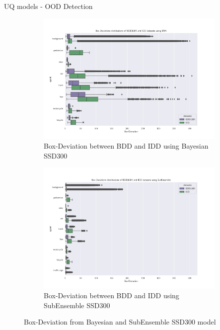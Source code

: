 \documentclass[10pt, aspectratio=169]{beamer}
\begin{document}
\begin{frame}[allowframebreaks]{UQ models - OOD Detection}
    \begin{figure}[H]
        \captionsetup[table]{skip=0pt}
            \centering
            \begin{subfigure}[t]{0.495\textwidth}
                \centering
                \includegraphics[width=\textwidth]{images/distributions/BNN_bdd_vs_iid_deviations.png}
                \caption{Box-Deviation between BDD and IDD using Bayesian SSD300}
            \end{subfigure}
            \begin{subfigure}[t]{0.495\textwidth}
                \centering
                \includegraphics[width=\textwidth]{images/distributions/SubEns_bdd_vs_iid_deviations.png}
                \caption{Box-Deviation between BDD and IDD using SubEnsemble SSD300}
            \end{subfigure}
            \caption{Box-Deviation from Bayesian and SubEnsemble SSD300 model}
    \end{figure}


\end{frame}
\end{document}
